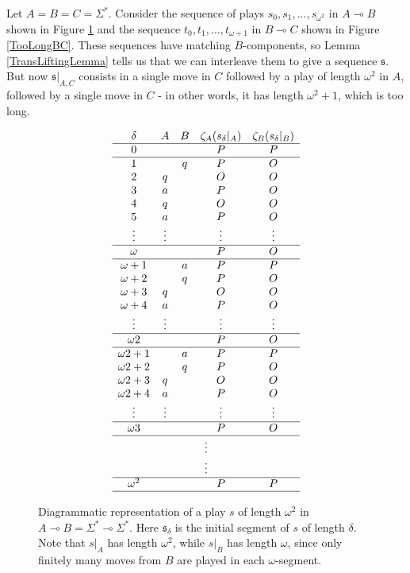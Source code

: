 \documentclass[11pt]{article} %
\theoremstyle{plain} %
\theoremstyle{definition} %
\theoremstyle{note}
\theoremstyle{exercisestyle}
\renewcommand{\implies}{\multimap}
\newcommand{\s}{\mathfrak s}
\newcommand{\st}{{\Sigma^*}}
\begin{document}
Let $A=B=C=\st$.  Consider the sequence of plays $s_0,s_1,\dots,s_{\omega^2}$ in $A\implies B$ shown in Figure \ref{TooLongAB} and the sequence $t_0,t_1,\dots,t_{\omega+1}$ in $B\implies C$ shown in Figure \ref{TooLongBC}.  These sequences have matching $B$-components, so Lemma \ref{TransLiftingLemma} tells us that we can interleave them to give a sequence $\s$.  But now $\s\vert_{A,C}$ consists in a single move in $C$ followed by a play of length $\omega^2$ in $A$, followed by a single move in $C$ - in other words, it has length $\omega^2+1$, which is too long.  
\begin{figure}[!ht]
  \[
    \begin{array}{ccccc}
      \delta & A & B & \zeta_A(s_\delta\vert_A) & \zeta_B(s_\delta\vert_B) \\
      \hline
      0 & & & P & P \\
      \hline
      1 & & q & P & O \\
      2 & q & & O & O \\
      3 & a & & P & O \\
      4 & q & & O & O \\
      5 & a & & P & O \\
      \vdots & \vdots & & \vdots & \vdots \\
      \hline
      \omega & & & P & O \\
      \hline
      \omega+1 & & a & P & P \\
      \omega+2 & & q & P & O \\
      \omega+3 & q & & O & O \\
      \omega+4 & a & & P & O \\
      \vdots & \vdots & & \vdots & \vdots \\
      \hline
      \omega2 & & & P & O \\
      \hline
      \omega2+1 & & a & P & P \\
      \omega2+2 & & q & P & O \\
      \omega2+3 & q & & O & O \\
      \omega2+4 & a & & P & O \\
      \vdots & \vdots & & \vdots & \vdots \\
      \hline
      \omega3 & & & P & O \\
      \hline
      \multicolumn{5}{c}{\vdots}\\
      \multicolumn{5}{c}{\vdots}\\
      \hline
      \omega^2 & & & P & P \\
      \hline
    \end{array}
    \]
  \caption{Diagrammatic representation of a play $s$ of length $\omega^2$ in $A\implies B=\st\implies \st$.  Here $\s_\delta$ is the initial segment of $s$ of length $\delta$.  Note that $s\vert_A$ has length $\omega^2$, while $s\vert_B$ has length $\omega$, since only finitely many moves from $B$ are played in each $\omega$-segment.}
  \label{TooLongAB}
\end{figure}
\end{document}
